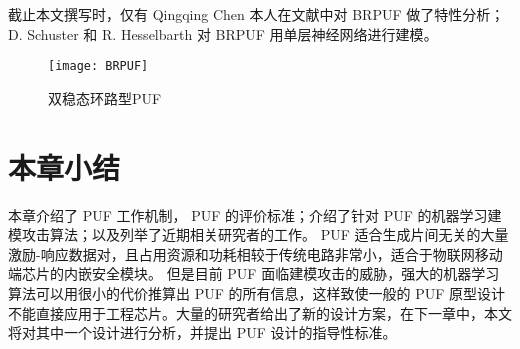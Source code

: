 截止本文撰写时，仅有 Qingqing Chen 本人在文献\parencite{chen2012characterization}中对 BRPUF 做了特性分析； D. Schuster 和 R. Hesselbarth 对 BRPUF 用单层神经网络进行建模\supercite{schuster2014evaluation}。

\begin{figure}[htb!]
\centering
\texttt{[image: BRPUF]}
\caption{双稳态环路型PUF}
\label{fig: brpuf}
\end{figure}

\section{本章小结}
本章介绍了 PUF 工作机制， PUF 的评价标准；介绍了针对 PUF 的机器学习建模攻击算法；以及列举了近期相关研究者的工作。 PUF 适合生成片间无关的大量激励-响应数据对，且占用资源和功耗相较于传统电路非常小，适合于物联网移动端芯片的内嵌安全模块。
但是目前 PUF 面临建模攻击的威胁，强大的机器学习算法可以用很小的代价推算出 PUF 的所有信息，这样致使一般的 PUF 原型设计不能直接应用于工程芯片。大量的研究者给出了新的设计方案，在下一章中，本文将对其中一个设计进行分析，并提出 PUF 设计的指导性标准。
